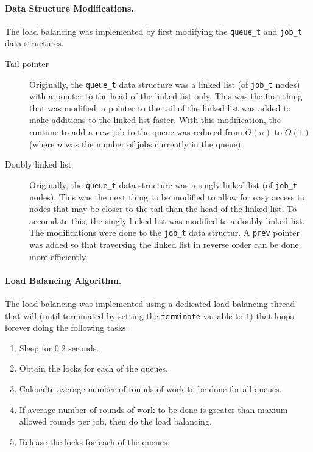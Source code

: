 \documentclass[12pt]{article}
\begin{document}
\paragraph{Data Structure Modifications.} The load balancing was implemented by first modifying the {\tt queue\_t} and {\tt job\_t} data structures.
\begin{description}
  \item [Tail pointer] Originally, the {\tt queue\_t} data structure was a linked list (of {\tt job\_t} nodes) with a pointer to the head of the linked list only. This was the first thing that was modified: a pointer to the tail of the linked list was added to make additions to the linked list faster. With this modification, the runtime to add a new job to the queue was reduced from \( O(n) \) to \( O(1) \) (where \( n \) was the number of jobs currently in the queue).

  \item [Doubly linked list] Originally, the {\tt queue\_t} data structure was a singly linked list (of {\tt job\_t} nodes). This was the next thing to be modified to allow for easy access to nodes that may be closer to the tail than the head of the linked list. To accomdate this, the singly linked list was modified to a doubly linked list. The modifications were done to the {\tt job\_t} data structur. A {\tt prev} pointer was added so that traversing the linked list in reverse order can be done more efficiently.
\end{description}

\paragraph{Load Balancing Algorithm.} The load balancing was implemented using a dedicated load balancing thread that will (until terminated by setting the {\tt terminate} variable to {\tt 1}) that loops forever doing the following tasks:
\begin{enumerate}
  \item Sleep for 0.2 seconds.
  \item Obtain the locks for each of the queues.
  \item Calcualte average number of rounds of work to be done for all queues.
  \item If average number of rounds of work to be done is greater than maxium allowed rounds per job, then do the load balancing.
  \item Release the locks for each of the queues.
\end{enumerate}
\end{document}
